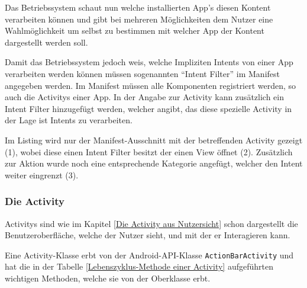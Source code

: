 Das Betriebssystem schaut nun welche installierten App's diesen Kontent verarbeiten k\"onnen und gibt bei mehreren M\"oglichkeiten dem Nutzer eine Wahlm\"oglichkeit um selbst zu bestimmen mit welcher App der Kontent dargestellt werden soll.

Damit das Betriebssystem jedoch weis, welche Impliziten Intents von einer App verarbeiten werden k\"onnen m\"ussen sogenannten "`Intent Filter"' im Manifest angegeben werden.
Im Manifest m\"ussen alle Komponenten registriert werden, so auch die Activitys einer App. In der Angabe zur Activity kann zus\"atzlich ein Intent Filter hinzugef\"ugt werden, welcher angibt, das diese spezielle Activity in der Lage ist Intents zu verarbeiten.

Im Listing wird nur der Manifest-Ausschnitt mit der betreffenden Activity gezeigt (1), wobei diese einen Intent Filter besitzt der einen View \"offnet (2). Zus\"atzlich zur Aktion wurde noch eine entsprechende Kategorie angef\"ugt, welcher den Intent weiter eingrenzt (3). \cite{VogellaIntent}



\subsubsection{Die Activity} \label{Die Activity aus Programmierersicht}
Activitys sind wie im Kapitel \ref{Die Activity aus Nutzersicht} schon dargestellt die Benutzeroberfl\"ache, welche der Nutzer sieht, und mit der er Interagieren kann.

Eine Activity-Klasse erbt von der Android-API-Klasse \texttt{ActionBarActivity} und hat die in der Tabelle \ref{Lebenszyklus-Methode einer Activity} aufgef\"uhrten wichtigen Methoden, welche sie von der Oberklasse erbt.

